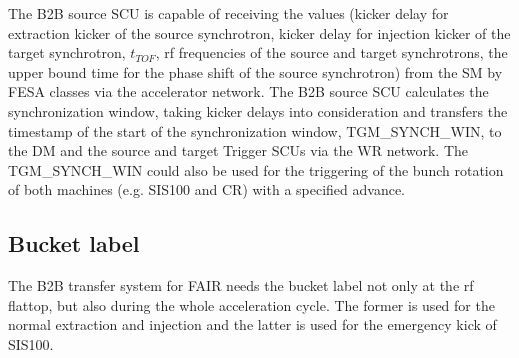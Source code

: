 The B2B source SCU is capable of receiving the values (kicker delay for extraction kicker of the source synchrotron, kicker delay for injection kicker of the target synchrotron, $t_{TOF}$, rf frequencies of the source and target synchrotrons, the upper bound time for the phase shift of the source synchrotron) from the SM by FESA classes via the accelerator network. The B2B source SCU calculates the synchronization window, taking kicker delays into consideration and transfers the timestamp of the start of the synchronization window, TGM\_SYNCH\_WIN, to the DM and the source and target Trigger SCUs via the WR network. The TGM\_SYNCH\_WIN could also be used for the triggering of the bunch rotation of both machines (e.g. SIS100 and CR) with a specified advance. 

\subsection{Bucket label}
\label{sec:bucket_label}
The B2B transfer system for FAIR needs the bucket label not only at the rf flattop, but also during the whole acceleration cycle. The former is used for the normal extraction and injection and the latter is used for the emergency kick of SIS100. 

